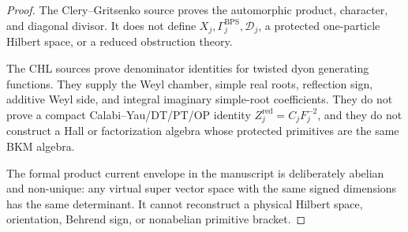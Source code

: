 \begin{proof}
The Clery--Gritsenko source proves the automorphic product, character,
and diagonal divisor.  It does not define
\(X_j,\Gamma_j^{\mathrm{BPS}},\mathscr D_j\), a protected
one-particle Hilbert space, or a reduced obstruction theory.

The CHL sources prove denominator identities for twisted dyon
generating functions.  They supply the Weyl chamber, simple real roots,
reflection sign, additive Weyl side, and integral imaginary
simple-root coefficients.  They do not prove a compact
Calabi--Yau/DT/PT/OP identity \(Z_j^{\mathrm{red}}=C_jF_j^{-2}\), and
they do not construct a Hall or factorization algebra whose protected
primitives are the same BKM algebra.

The formal product current envelope in the manuscript is deliberately
abelian and non-unique: any virtual super vector space with the same
signed dimensions has the same determinant.  It cannot reconstruct a
physical Hilbert space, orientation, Behrend sign, or nonabelian
primitive bracket.
\end{proof}

